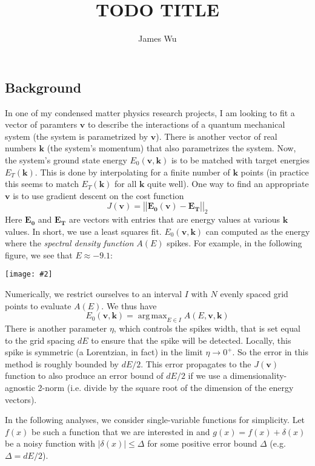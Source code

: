 \documentclass[letterpaper,11pt]{article}
\title{TODO TITLE}
\author{James Wu \quad 92277235}
\date{}
\newcommand*{\abs}[1]{\left| #1 \right|}
\newcommand*{\norm}[1]{\abs{\abs{#1}}}
\DeclareMathOperator*{\argmax}{arg\,max}
\newcommand*{\qimg}[2]{\\ \begin{center}\texttt{[image: \#2]}\end{center}}
\begin{document}
\maketitle
\begin{flushleft}
    
    \section{Background}
    In one of my condensed matter physics research projects, I am looking to fit a vector of paramters $\mathbf{v}$ to describe the interactions of a quantum mechanical system (the system is parametrized by $\mathbf{v}$). There is another vector of real numbers $\mathbf{k}$ (the system's momentum) that also parametrizes the system. Now, the system's ground state energy $E_0(\mathbf{v}, \mathbf{k})$ is to be matched with target energies $E_T(\mathbf{k})$. This is done by interpolating for a finite number of $\mathbf{k}$ points (in practice this seems to match $E_T(\mathbf{k})$ for all $\mathbf{k}$ quite well). One way to find an appropriate $\mathbf{v}$ is to use gradient descent on the cost function
    $$J(\mathbf{v}) = \norm{\mathbf{E_0}(\mathbf{v}) - \mathbf{E_T}}_2$$
    Here $\mathbf{E_0}$ and $\mathbf{E_T}$ are vectors with entries that are energy values at various $\mathbf{k}$ values. In short, we use a least squares fit. $E_0(\mathbf{v}, \mathbf{k})$ can computed as the energy where the \textit{spectral density function} $A(E)$ spikes. For example, in the following figure, we see that $E \approx -9.1$:
    \qimg{0.8}{img/spec.jpg}
    Numerically, we restrict ourselves to an interval $I$ with $N$ evenly spaced grid points to evaluate $A(E)$. We thus have
    $$E_0(\mathbf{v}, \mathbf{k}) = \argmax_{E \in I} A(E, \mathbf{v}, \mathbf{k})$$
    There is another parameter $\eta$, which controls the spikes width, that is set equal to the grid spacing $dE$ to ensure that the spike will be detected. Locally, this spike is symmetric (a Lorentzian, in fact) in the limit $\eta \to 0^+$. So the error in this method is roughly bounded by $dE/2$. This error propagates to the $J(\mathbf{v})$ function to also produce an error bound of $dE/2$ if we use a dimensionality-agnostic 2-norm (i.e. divide by the square root of the dimension of the energy vectors).

    In the following analyses, we consider single-variable functions for simplicity. Let $f(x)$ be such a function that we are interested in and $g(x) = f(x) + \delta(x)$ be a noisy function with $|\delta(x)| \leq \Delta$ for some positive error bound $\Delta$ (e.g. $\Delta = dE/2$).


\end{flushleft}
\end{document}
